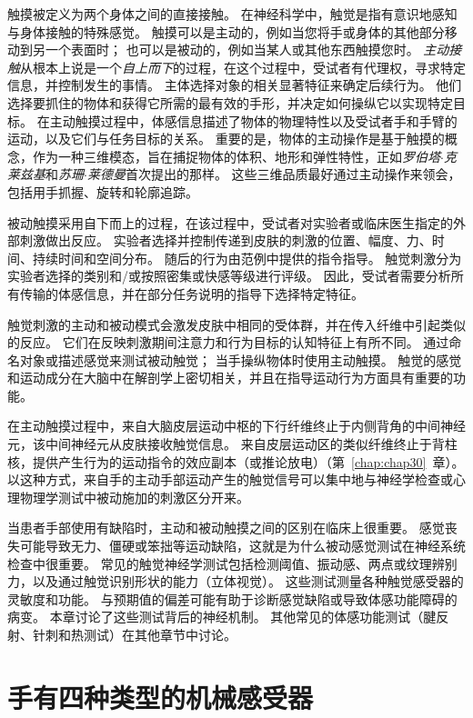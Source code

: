 触摸被定义为两个身体之间的直接接触。
在神经科学中，触觉是指有意识地感知与身体接触的特殊感觉。
触摸可以是主动的，例如当您将手或身体的其他部分移动到另一个表面时；
也可以是被动的，例如当某人或其他东西触摸您时。
\textit{主动接触}从根本上说是一个\textit{自上而下}的过程，在这个过程中，受试者有代理权，寻求特定信息，并控制发生的事情。
主体选择对象的相关显著特征来确定后续行为。
他们选择要抓住的物体和获得它所需的最有效的手形，并决定如何操纵它以实现特定目标。
在主动触摸过程中，体感信息描述了物体的物理特性以及受试者手和手臂的运动，以及它们与任务目标的关系。
重要的是，物体的主动操作是基于触摸的概念，作为一种三维模态，旨在捕捉物体的体积、地形和弹性特性，正如\textit{罗伯塔$\cdot$克莱兹基}和\textit{苏珊$\cdot$莱德曼}首次提出的那样。
这些三维品质最好通过主动操作来领会，包括用手抓握、旋转和轮廓追踪。


被动触摸采用自下而上的过程，在该过程中，受试者对实验者或临床医生指定的外部刺激做出反应。
实验者选择并控制传递到皮肤的刺激的位置、幅度、力、时间、持续时间和空间分布。
随后的行为由范例中提供的指令指导。
触觉刺激分为实验者选择的类别和/或按照密集或快感等级进行评级。
因此，受试者需要分析所有传输的体感信息，并在部分任务说明的指导下选择特定特征。


触觉刺激的主动和被动模式会激发皮肤中相同的受体群，并在传入纤维中引起类似的反应。
它们在反映刺激期间注意力和行为目标的认知特征上有所不同。
通过命名对象或描述感觉来测试被动触觉；
当手操纵物体时使用主动触摸。
触觉的感觉和运动成分在大脑中在解剖学上密切相关，并且在指导运动行为方面具有重要的功能。


在主动触摸过程中，来自大脑皮层运动中枢的下行纤维终止于内侧背角的中间神经元，该中间神经元从皮肤接收触觉信息。
来自皮层运动区的类似纤维终止于背柱核，提供产生行为的运动指令的效应副本（或推论放电）（第~\ref{chap:chap30}~章）。
以这种方式，来自手的主动手部运动产生的触觉信号可以集中地与神经学检查或心理物理学测试中被动施加的刺激区分开来。


当患者手部使用有缺陷时，主动和被动触摸之间的区别在临床上很重要。
感觉丧失可能导致无力、僵硬或笨拙等运动缺陷，这就是为什么被动感觉测试在神经系统检查中很重要。
常见的触觉神经学测试包括检测阈值、振动感、两点或纹理辨别力，以及通过触觉识别形状的能力（立体视觉）。 
这些测试测量各种触觉感受器的灵敏度和功能。
与预期值的偏差可能有助于诊断感觉缺陷或导致体感功能障碍的病变。
本章讨论了这些测试背后的神经机制。
其他常见的体感功能测试（腱反射、针刺和热测试）在其他章节中讨论。



\section{手有四种类型的机械感受器}

